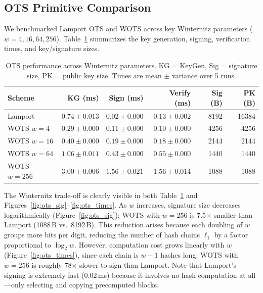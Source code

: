 \documentclass[10pt,a4paper,twocolumn]{article}
\begin{document}
\subsection{OTS Primitive Comparison}

We benchmarked Lamport OTS and WOTS across key Winternitz parameters ($w=4, 16, 64, 256$). Table~\ref{tab:ots_full} summarizes the key generation, signing, verification times, and key/signature sizes.

\begin{table}[t]
\centering
\small
\begin{tabular}{lrrrrr}
\toprule
\textbf{Scheme} & \textbf{KG (ms)} & \textbf{Sign (ms)} & \textbf{Verify (ms)} & \textbf{Sig (B)} & \textbf{PK (B)} \\
\midrule
Lamport          & $0.74 \pm 0.013$ & $0.02 \pm 0.000$ & $0.13 \pm 0.002$ & 8192  & 16384 \\
WOTS $w\!=\!4$   & $0.29 \pm 0.000$ & $0.11 \pm 0.000$ & $0.10 \pm 0.000$ & 4256  & 4256  \\
WOTS $w\!=\!16$  & $0.40 \pm 0.000$ & $0.19 \pm 0.000$ & $0.18 \pm 0.000$ & 2144  & 2144  \\
WOTS $w\!=\!64$  & $1.06 \pm 0.011$ & $0.43 \pm 0.000$ & $0.55 \pm 0.000$ & 1440  & 1440  \\
WOTS $w\!=\!256$ & $3.00 \pm 0.006$ & $1.56 \pm 0.021$ & $1.56 \pm 0.014$ & 1088  & 1088  \\
\bottomrule
\end{tabular}
\caption{OTS performance across Winternitz parameters. KG = KeyGen, Sig = signature size, PK = public key size. Times are mean $\pm$ variance over 5 runs.}
\label{tab:ots_full}
\end{table}

The Winternitz trade-off is clearly visible in both Table~\ref{tab:ots_full} and Figures~\ref{fig:ots_sig}--\ref{fig:ots_times}. As $w$ increases, signature size decreases logarithmically (Figure~\ref{fig:ots_sig}): WOTS with $w\!=\!256$ is 7.5$\times$ smaller than Lamport (1088\,B vs.\ 8192\,B). This reduction arises because each doubling of $w$ groups more bits per digit, reducing the number of hash chains $\ell_1$ by a factor proportional to $\log_2 w$. However, computation cost grows linearly with $w$ (Figure~\ref{fig:ots_times}), since each chain is $w-1$ hashes long: WOTS with $w\!=\!256$ is roughly 78$\times$ slower to sign than Lamport. Note that Lamport's signing is extremely fast (0.02\,ms) because it involves no hash computation at all---only selecting and copying precomputed blocks.
\end{document}

